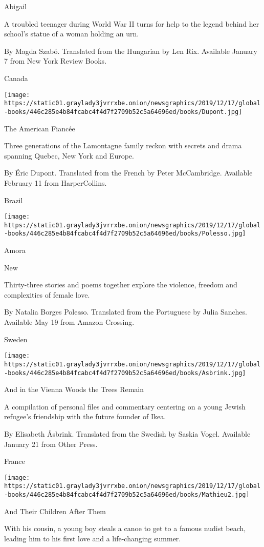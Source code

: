 Abigail

A troubled teenager during World War II turns for help to the legend
behind her school's statue of a woman holding an urn.

 By Magda Szabó. Translated from the Hungarian by Len Rix. Available
January 7 from New York Review Books.

Canada

\texttt{[image: https://static01.graylady3jvrrxbe.onion/newsgraphics/2019/12/17/global-books/446c285e4b84fcabc4f4d7f2709b52c5a64696ed/books/Dupont.jpg]}

The American Fiancée

Three generations of the Lamontagne family reckon with secrets and drama
spanning Quebec, New York and Europe.

 By Éric Dupont. Translated from the French by Peter McCambridge.
Available February 11 from HarperCollins.

Brazil

\texttt{[image: https://static01.graylady3jvrrxbe.onion/newsgraphics/2019/12/17/global-books/446c285e4b84fcabc4f4d7f2709b52c5a64696ed/books/Polesso.jpg]}

Amora

New

Thirty-three stories and poems together explore the violence, freedom
and complexities of female love.

 By Natalia Borges Polesso. Translated from the Portuguese by Julia
Sanches. Available May 19 from Amazon Crossing.

Sweden

\texttt{[image: https://static01.graylady3jvrrxbe.onion/newsgraphics/2019/12/17/global-books/446c285e4b84fcabc4f4d7f2709b52c5a64696ed/books/Asbrink.jpg]}

And in the Vienna Woods the Trees Remain

A compilation of personal files and commentary centering on a young
Jewish refugee's friendship with the future founder of Ikea.

 By Elisabeth Åsbrink. Translated from the Swedish by Saskia Vogel.
Available January 21 from Other Press.

France

\texttt{[image: https://static01.graylady3jvrrxbe.onion/newsgraphics/2019/12/17/global-books/446c285e4b84fcabc4f4d7f2709b52c5a64696ed/books/Mathieu2.jpg]}

And Their Children After Them

With his cousin, a young boy steals a canoe to get to a famous nudist
beach, leading him to his first love and a life-changing summer.

